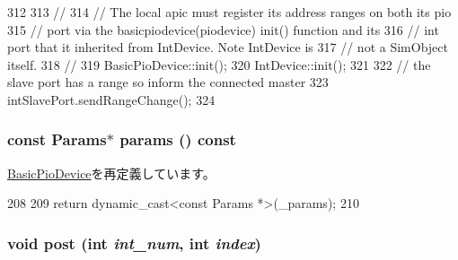 \begin{DoxyCode}
312 {
313     //
314     // The local apic must register its address ranges on both its pio
315     // port via the basicpiodevice(piodevice) init() function and its
316     // int port that it inherited from IntDevice.  Note IntDevice is
317     // not a SimObject itself.
318     //
319     BasicPioDevice::init();
320     IntDevice::init();
321 
322     // the slave port has a range so inform the connected master
323     intSlavePort.sendRangeChange();
324 }
\end{DoxyCode}
\hypertarget{classX86ISA_1_1Interrupts_acd3c3feb78ae7a8f88fe0f110a718dff}{
\subsubsection[{params}]{\setlength{\rightskip}{0pt plus 5cm}const {\bf Params}$\ast$ params () const}}
\label{classX86ISA_1_1Interrupts_acd3c3feb78ae7a8f88fe0f110a718dff}


\hyperlink{classBasicPioDevice_acd3c3feb78ae7a8f88fe0f110a718dff}{BasicPioDevice}を再定義しています。


\begin{DoxyCode}
208     {
209         return dynamic_cast<const Params *>(_params);
210     }
\end{DoxyCode}
\hypertarget{classX86ISA_1_1Interrupts_a24c6c4fbdc0605bcd015ce06f194e4b4}{
\subsubsection[{post}]{\setlength{\rightskip}{0pt plus 5cm}void post (int {\em int\_\-num}, \/  int {\em index})}}
\label{classX86ISA_1_1Interrupts_a24c6c4fbdc0605bcd015ce06f194e4b4}



